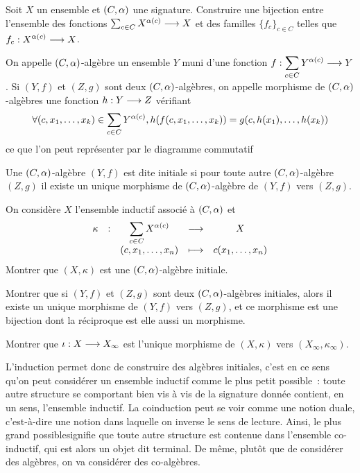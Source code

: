 \begin{problem}[La coinduction]
  \begin{pbQuest}
  \item Soit $X$ un ensemble et $(C,\alpha)$ une signature. Construire une
    bijection entre l'ensemble des fonctions
    $\sum_{c \in C} X^{\alpha(c)} \longrightarrow X$
    et des familles $\{f_c\}_{c \in C}$ telles que
    $f_c : \displaystyle X^{\alpha(c)} \longrightarrow X$.
  \end{pbQuest}
  On appelle $(C,\alpha)$-algèbre un ensemble $Y$ muni d'une fonction
  $f : \displaystyle \sum_{c\in C} Y^{\alpha(c)} \longrightarrow Y$.
  Si $(Y,f)$ et $(Z,g)$ sont deux
  $(C,\alpha)$-algèbres, on appelle morphisme de $(C,\alpha)$-algèbres une
  fonction $h : \displaystyle Y \longrightarrow Z$ vérifiant
  \[\forall (c, x_1,\ldots,x_k) \in \sum_{c \in C} Y^{\alpha(c)},
  h(f(c, x_1,\ldots,x_k)) = g(c,h(x_1),\ldots,h(x_k))\]
  ce que l'on peut représenter par le diagramme commutatif
  \begin{center}
  \end{center}
  Une $(C,\alpha)$-algèbre $(Y,f)$ est dite initiale si pour toute autre
  $(C,\alpha)$-algèbre $(Z,g)$ il existe un unique morphisme de
  $(C,\alpha)$-algèbre de $(Y,f)$ vers $(Z,g)$.

  \begin{pbQuest}[resume]
  \item On considère $X$ l'ensemble inductif associé à $(C,\alpha)$ et
    \[\makeFun{\kappa}{\sum_{c\in C}X^{\arite(c)}}{X}
              {(c,x_1,\ldots,x_n)}{c(x_1,\ldots,x_n)}\]
    Montrer que $(X,\kappa)$ est une $(C,\alpha)$-algèbre initiale.
  \item Montrer que si $(Y,f)$ et $(Z,g)$ sont deux $(C,\alpha)$-algèbres
    initiales, alors il existe un unique morphisme de $(Y,f)$ vers $(Z,g)$, et
    ce morphisme est une bijection dont la réciproque est elle aussi un
    morphisme.
  \item Montrer que $\iota : \displaystyle X \longrightarrow X_\infty$ est l'unique morphisme
    de $(X,\kappa)$ vers $(X_\infty,\kappa_\infty)$.
  \end{pbQuest}
  L'induction permet donc de construire des algèbres initiales, c'est en ce
  sens qu'on peut considérer un ensemble inductif comme \og le plus petit
  possible\fg~: toute autre structure se comportant bien vis à vis de la
  signature donnée contient, en un sens, l'ensemble inductif. La coinduction
  peut se voir comme une notion duale, c'est-à-dire une notion dans laquelle
  on inverse le sens de lecture. Ainsi, \og le plus grand possible\fg signifie
  que toute autre structure est contenue dans l'ensemble co-inductif, qui est
  alors un objet dit terminal. De même, plutôt que de considérer des algèbres,
  on va considérer des co-algèbres.
  

\end{problem}
